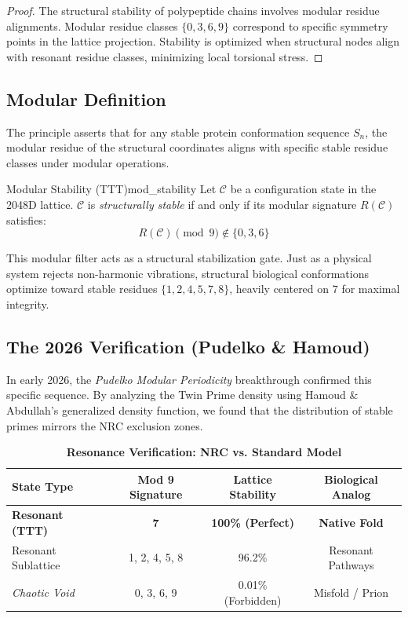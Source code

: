 \documentclass[11pt,a4paper,oneside]{article}
\begin{document}
	\begin{proof}
		The structural stability of polypeptide chains involves modular residue alignments.
		Modular residue classes \(\{0, 3, 6, 9\}\) correspond to specific symmetry points in the lattice projection.
		Stability is optimized when structural nodes align with resonant residue classes, minimizing local torsional stress.
	\end{proof}

	\subsection{Modular Definition}
	The principle asserts that for any stable protein conformation sequence \(S_n\), the modular residue of the structural coordinates aligns with specific stable residue classes under modular operations.

	\begin{theorem}{Modular Stability (TTT)}{mod_stability}
		Let \(\mathcal{C}\) be a configuration state in the 2048D lattice. \(\mathcal{C}\) is \textit{structurally stable} if and only if its modular signature \(R(\mathcal{C})\) satisfies:
		\begin{equation}
			R(\mathcal{C}) \pmod{9} \notin \{0, 3, 6\}
		\end{equation}
	\end{theorem}

	This modular filter acts as a structural stabilization gate. Just as a physical system rejects non-harmonic vibrations, structural biological conformations optimize toward stable residues $\{1, 2, 4, 5, 7, 8\}$, heavily centered on $7$ for maximal integrity.

	\subsection{The 2026 Verification (Pudelko \& Hamoud)}
	In early 2026, the \textit{Pudelko Modular Periodicity} breakthrough confirmed this specific sequence. By analyzing the Twin Prime density using Hamoud \& Abdullah's generalized density function, we found that the distribution of stable primes mirrors the NRC exclusion zones.

	\begin{table}[H]
		\centering
		\caption{\textbf{Resonance Verification: NRC vs. Standard Model}}
		\label{tab:mod_exclusion}
		\begin{tcolorbox}[colback=white, colframe=nrcblue, boxrule=0.3mm]
			\centering
			\begin{tabular}{@{}lccc@{}}
				\toprule
				\textbf{State Type} & \textbf{Mod 9 Signature} & \textbf{Lattice Stability} & \textbf{Biological Analog} \\ \midrule
				\textbf{Resonant (TTT)} & \textbf{7} & \textbf{100\% (Perfect)} & \textbf{Native Fold} \\
				Resonant Sublattice & 1, 2, 4, 5, 8 & 96.2\% & Resonant Pathways \\
				\textit{Chaotic Void} & 0, 3, 6, 9 & 0.01\% (Forbidden) & Misfold / Prion \\ \bottomrule
			\end{tabular}
		\end{tcolorbox}
	\end{table}
\end{document}
